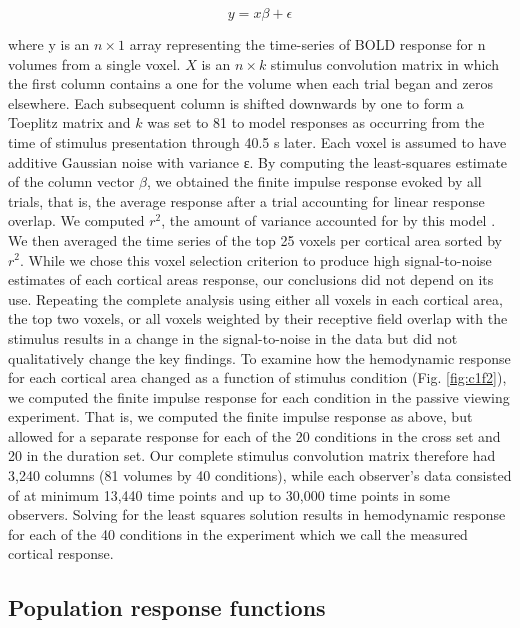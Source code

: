 \documentclass{report}
\begin{document}
\begin{equation}
    y=x\beta+\epsilon
\end{equation}

where y is an $n\times 1$ array representing the time-series of BOLD response for n volumes from a single voxel. $X$ is an $n\times k$ stimulus convolution matrix in which the first column contains a one for the volume when each trial began and zeros elsewhere. Each subsequent column is shifted downwards by one to form a Toeplitz matrix and $k$ was set to 81 to model responses as occurring from the time of stimulus presentation through 40.5 s later. Each voxel is assumed to have additive Gaussian noise with variance ε. By computing the least-squares estimate of the column vector $\beta$, we obtained the finite impulse response evoked by all trials, that is, the average response after a trial accounting for linear response overlap. We computed $r^2$, the amount of variance accounted for by this model \citep{Gardner2005-pg}. We then averaged the time series of the top 25 voxels per cortical area sorted by $r^2$. While we chose this voxel selection criterion to produce high signal-to-noise estimates of each cortical areas response, our conclusions did not depend on its use. Repeating the complete analysis using either all voxels in each cortical area, the top two voxels, or all voxels weighted by their receptive field overlap with the stimulus results in a change in the signal-to-noise in the data but did not qualitatively change the key findings.
To examine how the hemodynamic response for each cortical area changed as a function of stimulus condition (Fig. \ref{fig:c1f2}), we computed the finite impulse response for each condition in the passive viewing experiment. That is, we computed the finite impulse response as above, but allowed for a separate response for each of the 20 conditions in the cross set and 20 in the duration set. Our complete stimulus convolution matrix therefore had 3,240 columns (81 volumes by 40 conditions), while each observer’s data consisted of at minimum 13,440 time points and up to 30,000 time points in some observers. Solving for the least squares solution results in hemodynamic response for each of the 40 conditions in the experiment which we call the measured cortical response.


\subsection{Population response functions}
\end{document}
